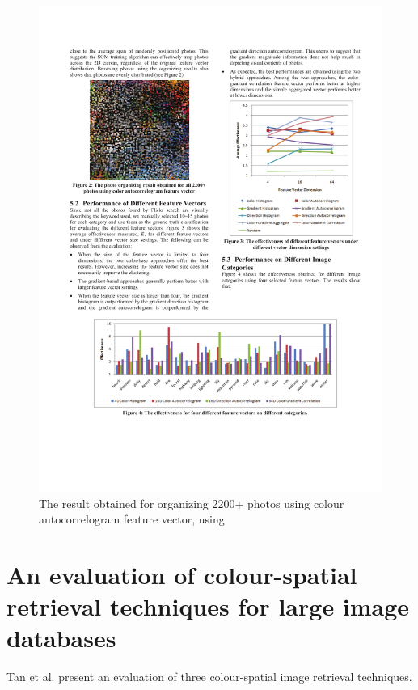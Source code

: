 \begin{figure}[ht]
	\centering
		\includegraphics[scale=1]{imgs-RelatedWork/Strong1}
	\caption{The result obtained for organizing 2200+ photos using colour autocorrelogram feature vector, using \cite{Strong:2009p413}}
	\label{fig:Strong1}
\end{figure}



\section{An evaluation of colour-spatial retrieval techniques for large image databases} %
\label{sub:Tan}

Tan et al. \cite{Tan:2001p850} present an evaluation of three colour-spatial image retrieval techniques.

